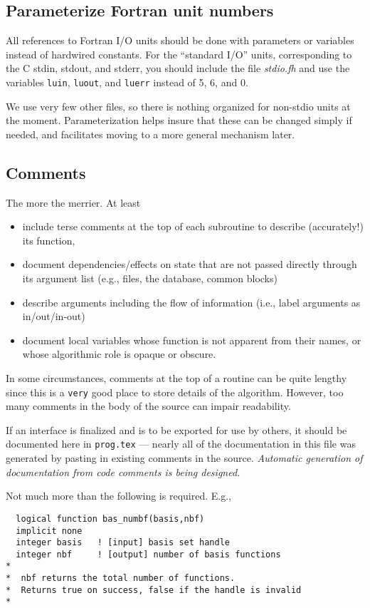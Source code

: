 \subsection{Parameterize Fortran unit numbers}

All references to Fortran I/O units should be done with parameters or
variables instead of hardwired constants.  For the ``standard I/O''
units, corresponding to the C stdin, stdout, and stderr, you should
include the file {\em stdio.fh} and use the variables \verb+luin+,
\verb+luout+, and \verb+luerr+ instead of 5, 6, and 0.

We use very few other files, so there is nothing organized for
non-stdio units at the moment.  Parameterization helps insure that
these can be changed simply if needed, and facilitates moving to a
more general mechanism later.

\subsection{Comments}

The more the merrier.  At least
\begin{itemize}
\item include terse comments at the top of each subroutine to describe
  (accurately!) its function,
\item document dependencies/effects on state that are not passed
  directly through its argument list (e.g., files, the database, common
  blocks)
\item describe arguments including the flow of information (i.e.,
  label arguments as in/out/in-out)
\item document local variables whose function is not apparent
  from their names, or whose algorithmic role is opaque or obscure.
\end{itemize}

In some circumstances, comments at the top of a routine can be quite
lengthy since this is a {\tt very} good place to store details of the
algorithm.  However, too many comments in the body of the source can
impair readability.

If an interface is finalized and is to be exported for use by others,
it should be documented here in {\tt prog.tex} --- nearly all of the
documentation in this file was generated by pasting in existing
comments in the source.  {\em Automatic generation of documentation
  from code comments is being designed.}

Not much more than the following is required.  E.g., 
\begin{verbatim}
  logical function bas_numbf(basis,nbf)
  implicit none
  integer basis   ! [input] basis set handle         
  integer nbf     ! [output] number of basis functions
*
*  nbf returns the total number of functions.
*  Returns true on success, false if the handle is invalid
*  
\end{verbatim}


